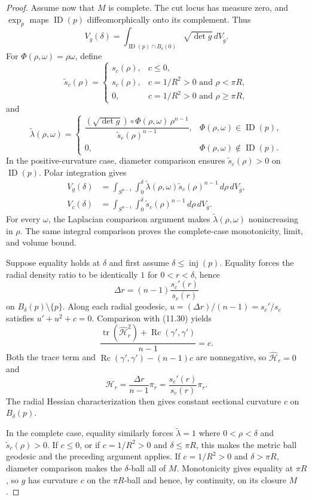 \begin{theorem}
\begin{proof}
Assume now that $M$ is complete. The cut locus has measure zero, and
$\exp_p$ maps $\operatorname{ID}(p)$ diffeomorphically onto its complement.
Thus
\[
V_g(\delta)
=\int_{\operatorname{ID}(p)\cap B_\delta(0)}
\sqrt{\det g}\,dV_{\widetilde g}.
\]
For $\Phi(\rho,\omega)=\rho\omega$, define
\[
\widetilde s_c(\rho)=
\begin{cases}
s_c(\rho),&c\leq0,\\
s_c(\rho),&c=1/R^2>0\text{ and }\rho<\pi R,\\
0,&c=1/R^2>0\text{ and }\rho\geq\pi R,
\end{cases}
\]
and
\[
\widetilde\lambda(\rho,\omega)=
\begin{cases}
\dfrac{
(\sqrt{\det g})\circ\Phi(\rho,\omega)\,\rho^{n-1}
}{
\widetilde s_c(\rho)^{n-1}
},
&\Phi(\rho,\omega)\in\operatorname{ID}(p),\\
0,&\Phi(\rho,\omega)\notin\operatorname{ID}(p).
\end{cases}
\]
In the positive-curvature case, diameter comparison ensures
$\widetilde s_c(\rho)>0$ on $\operatorname{ID}(p)$. Polar integration gives
\begin{align*}
V_g(\delta)
&=\int_{S^{n-1}}\int_0^\delta
\widetilde\lambda(\rho,\omega)
\widetilde s_c(\rho)^{n-1}\,d\rho\,dV_{\overline g},\\
V_c(\delta)
&=\int_{S^{n-1}}\int_0^\delta
\widetilde s_c(\rho)^{n-1}\,d\rho\,dV_{\overline g}.
\end{align*}
For every $\omega$, the Laplacian comparison argument makes
$\widetilde\lambda(\rho,\omega)$ nonincreasing in $\rho$. The same integral
comparison proves the complete-case monotonicity, limit, and volume bound.

Suppose equality holds at $\delta$ and first assume
$\delta\leq\operatorname{inj}(p)$. Equality forces the radial density ratio
to be identically $1$ for $0<r<\delta$, hence
\begin{equation}
\Delta r=(n-1)\frac{s_c'(r)}{s_c(r)}
\tag{11.33}
\end{equation}
on $B_\delta(p)\setminus\{p\}$. Along each radial geodesic,
$u=(\Delta r)/(n-1)=s_c'/s_c$ satisfies $u'+u^2+c=0$. Comparison with
(11.30) yields
\[
\frac{
\operatorname{tr}(\widehat{\mathcal H}_r^2)
+\operatorname{Rc}(\gamma',\gamma')
}{n-1}=c.
\]
Both the trace term and
$\operatorname{Rc}(\gamma',\gamma')-(n-1)c$ are nonnegative, so
$\widehat{\mathcal H}_r=0$ and
\[
\mathcal H_r
=\frac{\Delta r}{n-1}\pi_r
=\frac{s_c'(r)}{s_c(r)}\pi_r.
\]
The radial Hessian characterization then gives constant sectional curvature
$c$ on $B_\delta(p)$.

In the complete case, equality similarly forces
$\widetilde\lambda=1$ where $0<\rho<\delta$ and
$\widetilde s_c(\rho)>0$. If $c\leq0$, or if
$c=1/R^2>0$ and $\delta\leq\pi R$, this makes the metric ball geodesic and
the preceding argument applies. If $c=1/R^2>0$ and $\delta>\pi R$, diameter
comparison makes the $\delta$-ball all of $M$. Monotonicity gives equality at
$\pi R$, so $g$ has curvature $c$ on the $\pi R$-ball and hence, by
continuity, on its closure $M$.
\end{proof}
\end{theorem}

